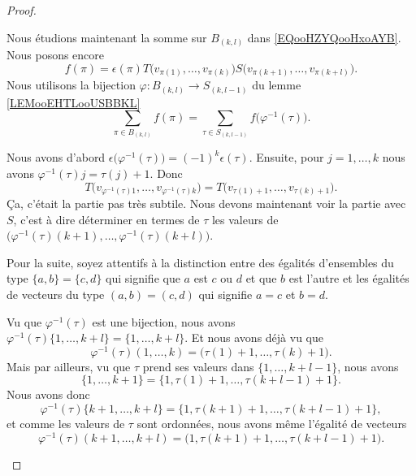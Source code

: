 \begin{proof}
\begin{subproof}
		Nous étudions maintenant la somme sur \( B_{(k,l)}\) dans \eqref{EQooHZYQooHxoAYB}. Nous posons encore
		\begin{equation}
			f(\pi)=\epsilon(\pi)T\big( v_{\pi(1)},\ldots, v_{\pi(k)} \big)S\big( v_{\pi(k+1)},\ldots,v_{\pi(k+l)} \big).
		\end{equation}
		Nous utilisons la bijection \(\varphi \colon B_{(k,l)}\to S_{(k,l-1)}  \) du lemme \ref{LEMooEHTLooUSBBKL}
		\begin{equation}
			\sum_{\pi\in B_{(k,l)}}f(\pi)=\sum_{\tau\in S_{(k,l-1)}}f\big( \varphi^{-1}(\tau) \big).
		\end{equation}

		Nous avons d'abord \( \epsilon\big( \varphi^{-1}(\tau) \big)=(-1)^k\epsilon(\tau)\). Ensuite, pour \( j=1,\ldots,k\) nous avons \( \varphi^{-1}(\tau)j=\tau(j)+1\). Donc
		\begin{equation}		\label{EQooRVUBooGsYfNE}
			T\big( v_{\varphi^{-1}(\tau)1},\ldots,v_{\varphi^{-1}(\tau)k} \big)=T\big( v_{\tau(1)+1},\ldots,v_{\tau(k)+1} \big).
		\end{equation}
		Ça, c'était la partie pas très subtile. Nous devons maintenant voir la partie avec \( S\), c'est à dire déterminer en termes de \( \tau\) les valeurs de \( \big( \varphi^{-1}(\tau)(k+1),\ldots,\varphi^{-1}(\tau)(k+l) \big)\).

		Pour la suite, soyez attentifs à la distinction entre des égalités d'ensembles du type \( \{ a,b \}=\{ c,d \}\) qui signifie que \( a\) est \( c\) ou \( d\) et que \( b\) est l'autre et les égalités de vecteurs du type \( (a,b)=(c,d)\) qui signifie \( a=c\) et \( b=d\).

		Vu que \( \varphi^{-1}(\tau)\) est une bijection, nous avons \( \varphi^{-1}(\tau)\{ 1,\ldots,k+l \}=\{ 1,\ldots,k+l \}\). Et nous avons déjà vu que
		\begin{equation}
			\varphi^{-1}(\tau)(1,\ldots,k)=\big( \tau(1)+1,\ldots,\tau(k)+1 \big).
		\end{equation}
		Mais par ailleurs, vu que \( \tau\) prend ses valeurs dans \( \{ 1,\ldots,k+l-1 \}\), nous avons
		\begin{equation}
			\{ 1,\ldots,k+1 \}=\{ 1,\tau(1)+1,\ldots,\tau(k+l-1)+1 \}.
		\end{equation}
		Nous avons donc
		\begin{equation}
			\varphi^{-1}(\tau)\{ k+1,\ldots,k+l \}=\{ 1,\tau(k+1)+1,\ldots,\tau(k+l-1)+1 \},
		\end{equation}
		et comme les valeurs de  \( \tau \) sont ordonnées, nous avons même l'égalité de vecteurs
		\begin{equation}
			\varphi^{-1}(\tau)(k+1,\ldots,k+l)=\big( 1,\tau(k+1)+1,\ldots,\tau(k+l-1)+1 \big).
		\end{equation}


\end{subproof}
\end{proof}
